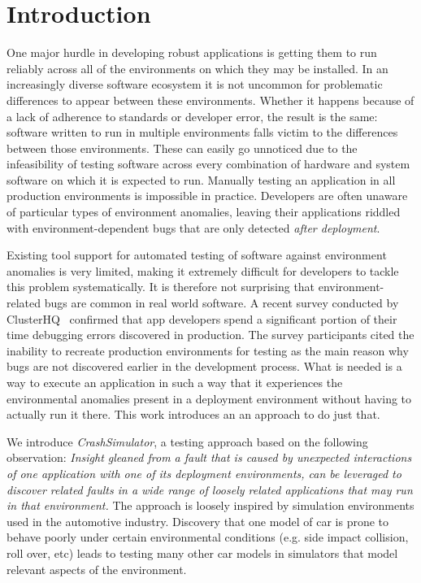 \section{Introduction}

One major hurdle in developing robust applications is getting them to run reliably across all of the environments on
which they may be installed.  In an increasingly diverse software ecosystem it is not uncommon for problematic
differences to appear between these environments.  Whether it happens because of a lack of adherence to standards or
developer error, the result is the same: software written to run in multiple environments falls victim to the
differences between those environments.  These can easily go unnoticed due to the infeasibility of testing software
across every combination of hardware and system software on which it is expected to run.  Manually testing an application in
all production environments is impossible in practice. Developers are often unaware of particular types of environment
anomalies, leaving their applications riddled with environment-dependent bugs that are only detected \emph{after
  deployment}.

Existing tool support for automated testing of software against environment anomalies is very limited, making it
extremely difficult for developers to tackle this problem systematically.  It is therefore not surprising that
environment-related bugs are common in real world software. A recent survey conducted by
ClusterHQ~\cite{ClusterHQSurvey} confirmed that app developers spend a significant portion of their time debugging
errors discovered in production.  The survey participants cited the inability to recreate production environments for
testing as the main reason why bugs are not discovered earlier in the development process.  What is needed is a way to
execute an application in such a way that it experiences the environmental anomalies present in a deployment environment
without having to actually run it there.  This work introduces an an approach to do just that.

We introduce {\em CrashSimulator}, a testing approach based on the following observation:
{\em Insight gleaned from a fault that is caused by unexpected interactions 
of {\em one application} with one of its deployment environments, can be leveraged 
to discover related faults in a {\em wide range} of loosely related applications that may run in that environment.}
The approach is loosely inspired by simulation environments used in the automotive industry. Discovery
that one model of car is prone to behave poorly under certain environmental conditions (e.g. side impact collision,
roll over, etc) leads to testing many other car models in simulators that model relevant aspects of the environment.


